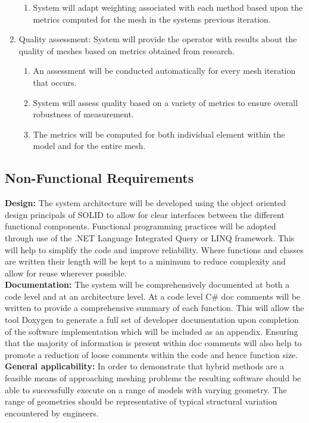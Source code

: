 \begin{enumerate}
\begin{enumerate}
\item System will adapt weighting associated with each method based upon the metrics computed for the mesh in the systems previous iteration.
\end{enumerate}

\item Quality assessment: System will provide the operator with results about the quality of meshes based on metrics obtained from research.

\begin{enumerate}
\item An assessment will be conducted automatically for every mesh iteration that occurs.

\item System will assess quality based on a variety of metrics to ensure overall robustness of measurement. 

\item The metrics will be computed for both individual element within the model and for the entire mesh.
\end{enumerate}
\end{enumerate}

\subsection{Non-Functional Requirements}


\textbf{Design:} The system architecture will be developed using the object oriented design principals of SOLID to allow for clear interfaces between the different functional components. Functional programming practices will be adopted through use of the .NET Language Integrated Query or LINQ framework. This will help to simplify the code and improve reliability. Where functions and classes are written their length will be kept to a minimum to reduce complexity and allow for reuse wherever possible. \\ 

\noindent
\textbf{Documentation:} The system will be comprehensively documented at both a code level and at an architecture level. At a code level C\# doc comments will be written to provide a comprehensive summary of each function. This will allow the tool Doxygen \cite{Doxygen} to generate a full set of developer documentation upon completion of the software implementation which will be included as an appendix. Ensuring that the majority of information is present within doc comments will also help to promote a reduction of loose comments within the code and hence function size. \\

\noindent
\textbf{General applicability:} In order to demonstrate that hybrid methods are a feasible means of approaching meshing problems the resulting software should be able to successfully execute on a range of models with varying geometry. The range of geometries should be representative of typical structural variation encountered by engineers.